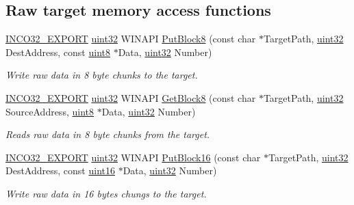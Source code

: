 \subsection*{Raw target memory access functions}
\begin{DoxyCompactItemize}
\item 
\hyperlink{inco__32_8h_a09505cad5bbb66fc36750a4fbca0444b}{I\+N\+C\+O32\+\_\+\+E\+X\+P\+O\+RT} \hyperlink{indeltypes_8h_a4b435a49c74bb91f284f075e63416cb6}{uint32} W\+I\+N\+A\+PI \hyperlink{group__commonfunctions_ga7b0fc73de1e81c47c9ee82db36ea7d35}{Put\+Block8} (const char $\ast$Target\+Path, \hyperlink{indeltypes_8h_a4b435a49c74bb91f284f075e63416cb6}{uint32} Dest\+Address, const \hyperlink{indeltypes_8h_adde6aaee8457bee49c2a92621fe22b79}{uint8} $\ast$Data, \hyperlink{indeltypes_8h_a4b435a49c74bb91f284f075e63416cb6}{uint32} Number)
\begin{DoxyCompactList}\small\item\em Write raw data in 8 byte chunks to the target. \end{DoxyCompactList}\item 
\hyperlink{inco__32_8h_a09505cad5bbb66fc36750a4fbca0444b}{I\+N\+C\+O32\+\_\+\+E\+X\+P\+O\+RT} \hyperlink{indeltypes_8h_a4b435a49c74bb91f284f075e63416cb6}{uint32} W\+I\+N\+A\+PI \hyperlink{group__commonfunctions_gab25d23eaf697606036d12356f94fc675}{Get\+Block8} (const char $\ast$Target\+Path, \hyperlink{indeltypes_8h_a4b435a49c74bb91f284f075e63416cb6}{uint32} Source\+Address, \hyperlink{indeltypes_8h_adde6aaee8457bee49c2a92621fe22b79}{uint8} $\ast$Data, \hyperlink{indeltypes_8h_a4b435a49c74bb91f284f075e63416cb6}{uint32} Number)
\begin{DoxyCompactList}\small\item\em Reads raw data in 8 byte chunks from the target. \end{DoxyCompactList}\item 
\hyperlink{inco__32_8h_a09505cad5bbb66fc36750a4fbca0444b}{I\+N\+C\+O32\+\_\+\+E\+X\+P\+O\+RT} \hyperlink{indeltypes_8h_a4b435a49c74bb91f284f075e63416cb6}{uint32} W\+I\+N\+A\+PI \hyperlink{group__commonfunctions_ga385128fec8e3c887078779f2d8deb0fb}{Put\+Block16} (const char $\ast$Target\+Path, \hyperlink{indeltypes_8h_a4b435a49c74bb91f284f075e63416cb6}{uint32} Dest\+Address, const \hyperlink{indeltypes_8h_a05f6b0ae8f6a6e135b0e290c25fe0e4e}{uint16} $\ast$Data, \hyperlink{indeltypes_8h_a4b435a49c74bb91f284f075e63416cb6}{uint32} Number)
\begin{DoxyCompactList}\small\item\em Write raw data in 16 bytes chungs to the target. \end{DoxyCompactList}\item 

\end{DoxyCompactItemize}
